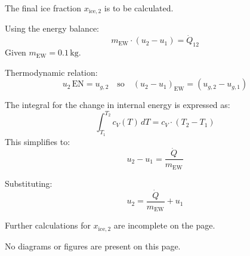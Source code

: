 The final ice fraction \( x_{\text{ice},2} \) is to be calculated.  

Using the energy balance:  
\[
m_{\text{EW}} \cdot (u_2 - u_1) = \dot{Q}_{12}
\]  
Given \( m_{\text{EW}} = 0.1 \, \text{kg} \).  

Thermodynamic relation:  
\[
u_2 \, \text{EN} = u_{g,2} \quad \text{so} \quad (u_2 - u_1)_{\text{EW}} = (u_{g,2} - u_{g,1})
\]  

The integral for the change in internal energy is expressed as:  
\[
\int_{T_1}^{T_2} c_V(T) \, dT = c_V \cdot (T_2 - T_1)
\]  
This simplifies to:  
\[
u_2 - u_1 = \frac{\dot{Q}}{m_{\text{EW}}}
\]  

Substituting:  
\[
u_2 = \frac{\dot{Q}}{m_{\text{EW}}} + u_1
\]  

Further calculations for \( x_{\text{ice},2} \) are incomplete on the page.  

No diagrams or figures are present on this page.